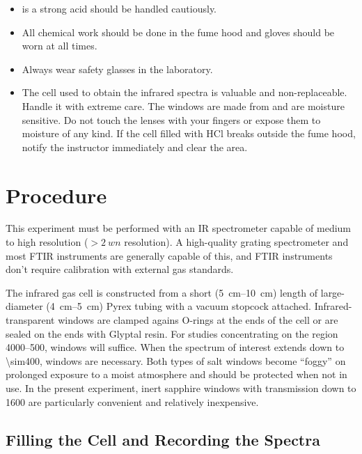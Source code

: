 \documentclass[nobib,nofonts,nols,nohyper]{tufte-handout}
\begin{document}
\begin{itemize}
	\item {} is a strong acid should be handled cautiously. 
	\item All chemical work should be done in the fume hood and gloves should be worn at all times. 
	\item Always wear safety glasses in the laboratory.
	\item The cell used to obtain the infrared spectra is valuable and non-replaceable. 
	Handle it with extreme care. 
	The windows are made from  and are moisture sensitive. 
	Do not touch the lenses with your fingers or expose them to moisture of any kind. 
	If the cell filled with HCl breaks outside the fume hood, notify the instructor immediately and clear the area. 
\end{itemize}


\section{Procedure} %
\label{sec:procedure}

This experiment must be performed with an IR spectrometer capable of medium to high resolution (\( > \SI{2}{wn} \) resolution). 
A high-quality grating spectrometer and most FTIR instruments are generally capable of this, and FTIR instruments don't require calibration with external gas standards. 

The infrared gas cell is constructed from a short (\SIrange{5}{10}{\cm}) length of large-diameter (\SIrange{4}{5}{\cm}) Pyrex tubing with a vacuum stopcock attached. 
Infrared-transparent windows are clamped agains O-rings at the ends of the cell or are sealed on the ends with Glyptal resin. 
For studies concentrating on the region \SIrange{4000}{500}{\wn},  windows will suffice. 
When the spectrum of interest extends down to \SI{\sim400}{\wn},  windows are necessary. 
Both types of salt windows become ``foggy'' on prolonged exposure to a moist atmosphere and should be protected when not in use. 
In the present experiment, inert sapphire windows with transmission down to \SI{1600}{\wn} are particularly convenient and relatively inexpensive. 

\subsection{Filling the Cell and Recording the Spectra} %
\label{sub:filling_the_cell}
\end{document}
